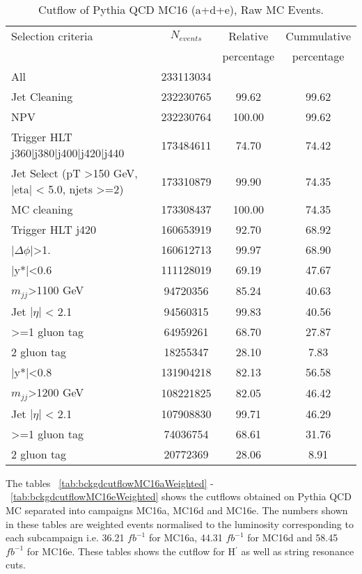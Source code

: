 \begin{table}[ht]
\begin{center}
\begin{tabular}{|l|c|c|c|}
\hline
Selection criteria & $N_{events}$ & Relative & Cummulative \\
 & & percentage & percentage \\
\hline
All & 233113034 &  & \\
Jet Cleaning & 232230765 & 99.62 & 99.62 \\
NPV & 232230764 & 100.00 & 99.62 \\
Trigger HLT j360|j380|j400|j420|j440 & 173484611 & 74.70 & 74.42 \\
Jet Select (pT >150 GeV, |eta| < 5.0, njets >=2) & 173310879 & 99.90 & 74.35 \\
MC cleaning & 173308437 & 100.00 & 74.35 \\
\hline
Trigger HLT j420 & 160653919 & 92.70 & 68.92 \\
$|\Delta\phi|$>1. & 160612713 & 99.97 & 68.90 \\
\hline\hline
|y*|<0.6 & 111128019 & 69.19 & 47.67 \\
$m_{jj}$>1100 GeV & 94720356 & 85.24 & 40.63 \\
Jet $|\eta|$ < 2.1 & 94560315 & 99.83 & 40.56 \\
>=1 gluon tag & 64959261 & 68.70 & 27.87 \\
2 gluon tag & 18255347 & 28.10 & 7.83 \\
\hline\hline
|y*|<0.8 & 131904218 & 82.13 & 56.58 \\
$m_{jj}$>1200 GeV & 108221825 & 82.05 & 46.42 \\
Jet $|\eta|$ < 2.1 & 107908830 & 99.71 & 46.29 \\
>=1 gluon tag & 74036754 & 68.61 & 31.76 \\
2 gluon tag & 20772369 & 28.06 & 8.91 \\
\hline
\end{tabular}
\end{center}
\caption{Cutflow of Pythia QCD MC16 (a+d+e), Raw MC Events.}
\label{tab:bckgdcutflowMC16aeTotalRaw}
\end{table}%

The tables ~\ref{tab:bckgdcutflowMC16aWeighted} - ~\ref{tab:bckgdcutflowMC16eWeighted} shows the cutflows obtained on Pythia QCD MC separated into 
campaigns MC16a, MC16d and MC16e. The numbers shown in these tables are weighted events normalised to the luminosity corresponding to each subcampaign i.e. 36.21 $fb^{-1}$ for MC16a, 44.31 $fb^{-1}$ for MC16d and 58.45 $fb^{-1}$ for MC16e.
These tables shows the cutflow for H$^\prime$ as well as string resonance cuts.

